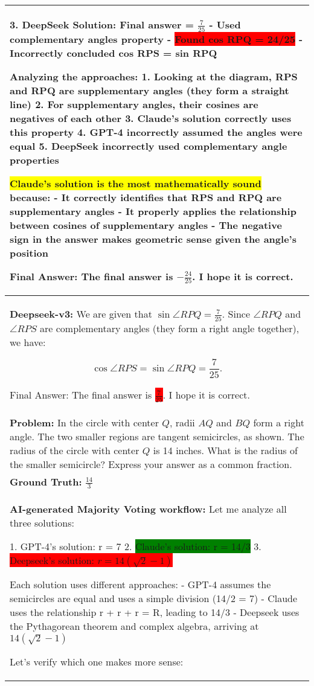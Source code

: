 \begin{longtable}{p{15cm}}
3. DeepSeek Solution: Final answer = $\frac{7}{25}$
- Used complementary angles property
- \colorbox{red}{Found cos RPQ = 24/25}
- Incorrectly concluded cos RPS = sin RPQ

Analyzing the approaches:
1. Looking at the diagram, RPS and RPQ are supplementary angles (they form a straight line)
2. For supplementary angles, their cosines are negatives of each other
3. Claude's solution correctly uses this property
4. GPT-4 incorrectly assumed the angles were equal
5. DeepSeek incorrectly used complementary angle properties

\colorbox{yellow}{Claude's solution is the most mathematically sound} because:
- It correctly identifies that RPS and RPQ are supplementary angles
- It properly applies the relationship between cosines of supplementary angles
- The negative sign in the answer makes geometric sense given the angle's position

Final Answer: The final answer is $-\frac{24}{25}$. I hope it is correct. \\
\midrule
\textbf{Deepseek-v3:} We are given that \(\sin \angle RPQ = \frac{7}{25}\). Since \(\angle RPQ\) and \(\angle RPS\) are complementary angles (they form a right angle together), we have:

\[
\cos \angle RPS = \sin \angle RPQ = \frac{7}{25}.
\]

Final Answer: The final answer is \colorbox{red}{\(\frac{7}{25}\)}. I hope it is correct. \\
\midrule
\textbf{Problem:} In the circle with center $Q$, radii $AQ$ and $BQ$ form a right angle. The two smaller regions are tangent semicircles, as shown. The radius of the circle with center $Q$ is 14 inches. What is the radius of the smaller semicircle? Express your answer as a common fraction.
\\
\midrule
\textbf{Ground Truth:} $\frac{14}{3}$ \\
\midrule
\textbf{AI-generated Majority Voting workflow:} Let me analyze all three solutions:

1. GPT-4's solution: r = 7
2. \colorbox{green}{Claude's solution: r = 14/3}
3. \colorbox{red}{Deepseek's solution: $r = 14(\sqrt{2} - 1)$}

Each solution uses different approaches:
- GPT-4 assumes the semicircles are equal and uses a simple division (14/2 = 7)
- Claude uses the relationship r + r + r = R, leading to 14/3
- Deepseek uses the Pythagorean theorem and complex algebra, arriving at $14(\sqrt{2} - 1)$

Let's verify which one makes more sense:


\end{longtable}
